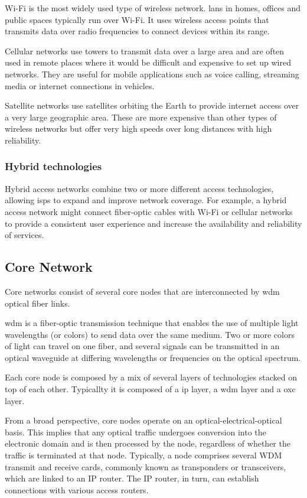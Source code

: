 Wi-Fi is the most widely used type of wireless network. \acp{lan} in homes, offices and public spaces typically run over Wi-Fi. It uses wireless access points that transmits data over radio frequencies to connect devices within its range.

Cellular networks use towers to transmit data over a large area and are often used in remote places where it would be difficult and expensive to set up wired networks. They are useful for mobile applications such as voice calling, streaming media or internet connections in vehicles.

Satellite networks use satellites orbiting the Earth to provide internet access over a very large geographic area. These are more expensive than other types of wireless networks but offer very high speeds over long distances with high reliability.


\subsubsection{Hybrid technologies}

Hybrid access networks combine two or more different access technologies, allowing \acp{isp} to expand and improve network coverage. For example, a hybrid access network might connect fiber-optic cables with Wi-Fi or cellular networks to provide a consistent user experience and increase the availability and reliability of services.

\subsection{Core Network}

Core networks consist of several core nodes that are interconnected by \ac{wdm} optical fiber links.

\ac{wdm} is a fiber-optic transmission technique that enables the use of multiple light wavelengths (or colors) to send data over the same medium. Two or more colors of light can travel on one fiber, and several signals can be transmitted in an optical waveguide at differing wavelengths or frequencies on the optical spectrum. 

Each core node is composed by a mix of several layers of technologies stacked on top of each other. Typicallty it is composed of a \ac{ip} layer, a \ac{wdm} layer and a \ac{oxc} layer.

From a broad perspective, core nodes operate on an optical-electrical-optical basis. This implies that any optical traffic undergoes conversion into the electronic domain and is then processed by the node, regardless of whether the traffic is terminated at that node. Typically, a node comprises several WDM transmit and receive cards, commonly known as transponders or transceivers, which are linked to an IP router. The IP router, in turn, can establish connections with various access routers.

